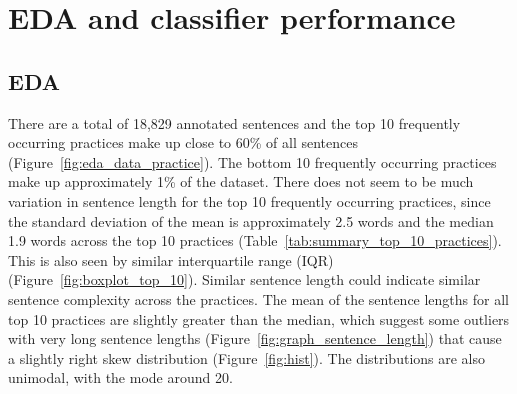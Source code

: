 
\chapter{EDA and classifier performance} %

\label{chapter3} %

\section{EDA}
There are a total of 18,829 annotated sentences and the top 10 frequently occurring practices make up close to 60\% of all sentences (Figure~\ref{fig:eda_data_practice}). The bottom 10 frequently occurring practices make up approximately 1\% of the dataset. There does not seem to be much variation in sentence length for the top 10 frequently occurring practices, since the standard deviation of the mean is approximately 2.5 words and the median 1.9 words across the top 10 practices (Table~\ref{tab:summary_top_10_practices}). This is also seen by similar interquartile range (IQR) (Figure~\ref{fig:boxplot_top_10}). Similar sentence length could indicate similar sentence complexity across the practices. The mean of the sentence lengths for all top 10 practices are slightly greater than the median, which suggest some outliers with very long sentence lengths (Figure~\ref{fig:graph_sentence_length}) that cause a slightly right skew distribution (Figure~\ref{fig:hist}). The distributions are also unimodal, with the mode around 20.

